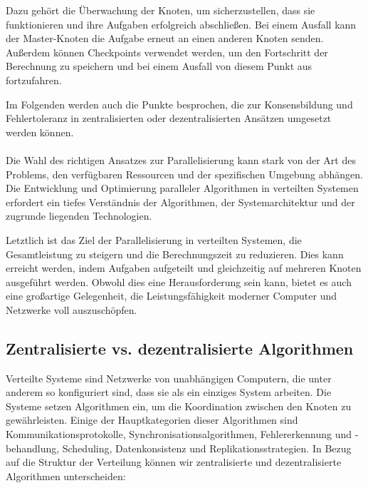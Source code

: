 Dazu gehört die Überwachung der Knoten, um sicherzustellen, dass sie funktionieren und ihre Aufgaben erfolgreich abschließen. Bei einem Ausfall kann der Master-Knoten die Aufgabe erneut an einen anderen Knoten senden. Außerdem können Checkpoints verwendet werden, um den Fortschritt der Berechnung zu speichern und bei einem Ausfall von diesem Punkt aus fortzufahren.

Im Folgenden werden auch die Punkte besprochen, die zur Konsensbildung und Fehlertoleranz in zentralisierten oder dezentralisierten Ansätzen umgesetzt werden können.
\\\\
Die Wahl des richtigen Ansatzes zur Parallelisierung kann stark von der Art des Problems, den verfügbaren Ressourcen und der spezifischen Umgebung abhängen. Die Entwicklung und Optimierung paralleler Algorithmen in verteilten Systemen erfordert ein tiefes Verständnis der Algorithmen, der Systemarchitektur und der zugrunde liegenden Technologien.

Letztlich ist das Ziel der Parallelisierung in verteilten Systemen, die Gesamtleistung zu steigern und die Berechnungszeit zu reduzieren. Dies kann erreicht werden, indem Aufgaben aufgeteilt und gleichzeitig auf mehreren Knoten ausgeführt werden. Obwohl dies eine Herausforderung sein kann, bietet es auch eine großartige Gelegenheit, die Leistungsfähigkeit moderner Computer und Netzwerke voll auszuschöpfen.


\subsection{Zentralisierte vs. dezentralisierte Algorithmen}

Verteilte Systeme sind Netzwerke von unabhängigen Computern, die unter anderem so konfiguriert sind, dass sie als ein einziges System arbeiten. Die Systeme setzen Algorithmen ein, um die Koordination zwischen den Knoten zu gewährleisten. Einige der Hauptkategorien dieser Algorithmen sind Kommunikationsprotokolle, Synchronisationsalgorithmen, Fehlererkennung und -behandlung, Scheduling, Datenkonsistenz und Replikationsstrategien. In Bezug auf die Struktur der Verteilung können wir zentralisierte und dezentralisierte Algorithmen unterscheiden:

